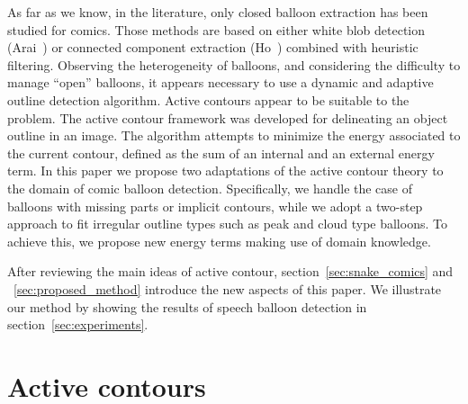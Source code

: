\documentclass[conference]{IEEEtran}
\begin{document}
As far as we know, in the literature, only closed balloon extraction has been studied for comics. Those methods are based on either white blob detection (Arai~\cite{Arai11}) or connected component extraction (Ho~\cite{Ho2012}) combined with heuristic filtering.
Observing the heterogeneity of balloons, and considering the difficulty to manage ``open'' balloons, it appears necessary to use a dynamic and adaptive outline detection algorithm. Active contours appear to be suitable to the problem.
The active contour framework was developed for delineating an object outline in an image. The algorithm attempts to minimize the energy associated to the current contour, defined as the sum of an internal and an external energy term. 
In this paper we propose two adaptations of the active contour theory to the domain of comic balloon detection. Specifically, we handle the case of balloons with missing parts or implicit contours, while we adopt a two-step approach to fit irregular outline types such as peak and cloud type balloons. 
To achieve this, we propose new energy terms making use of domain knowledge.

After reviewing the main ideas of active contour, section~\ref{sec:snake_comics} and ~\ref{sec:proposed_method} introduce the new aspects of this paper. We illustrate our method by showing the results of speech balloon detection in section~\ref{sec:experiments}.

\section{Active contours}
\label{sec:snake}
\end{document}
